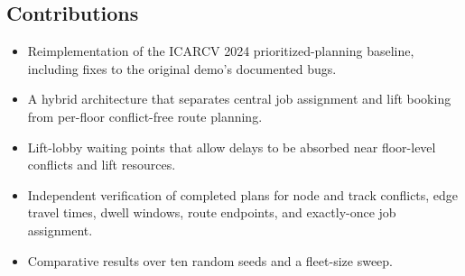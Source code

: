 \subsection*{Contributions}
\begin{itemize}
  \item Reimplementation of the ICARCV 2024 prioritized-planning baseline,
        including fixes to the original demo's documented bugs.
  \item A hybrid architecture that separates central job assignment and lift
        booking from per-floor conflict-free route planning.
  \item Lift-lobby waiting points that allow delays to be absorbed near
        floor-level conflicts and lift resources.
  \item Independent verification of completed plans for node and track
        conflicts, edge travel times, dwell windows, route endpoints, and
        exactly-once job assignment.
  \item Comparative results over ten random seeds and a fleet-size sweep.
\end{itemize}


